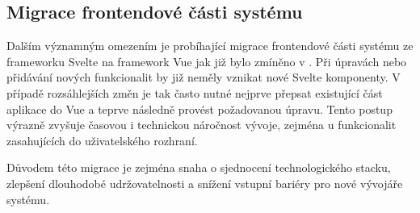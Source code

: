 \subsection{Migrace frontendové části systému}
\label{subsec:kelvin-development-migration}

Dalším významným omezením je probíhající migrace frontendové části systému ze frameworku Svelte na framework Vue jak již bylo zmíněno v .
Při úpravách nebo přidávání nových funkcionalit by již neměly vznikat nové Svelte komponenty.
V případě rozsáhlejších změn je tak často nutné nejprve přepsat existující část aplikace do Vue a teprve následně provést požadovanou úpravu.
Tento postup výrazně zvyšuje časovou i technickou náročnost vývoje, zejména u funkcionalit zasahujících do uživatelského rozhraní.

Důvodem této migrace je zejména snaha o sjednocení technologického stacku, zlepšení dlouhodobé udržovatelnosti a snížení vstupní bariéry pro nové vývojáře systému.

\endinput
